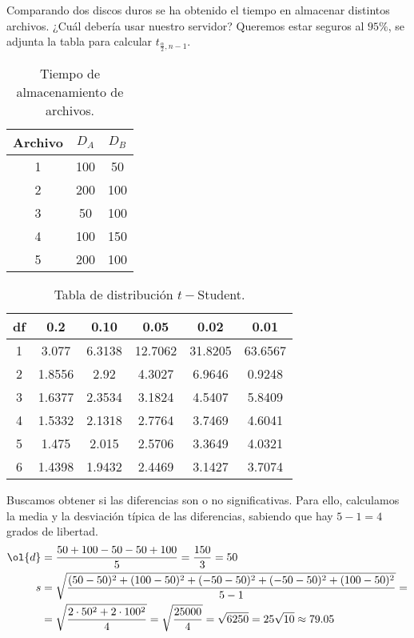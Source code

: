\documentclass[12pt]{article}
\begin{document}
    \begin{ejercicio}[3 puntos]
        Comparando dos discos duros se ha obtenido el tiempo en almacenar distintos archivos. ¿Cuál debería usar nuestro servidor? Queremos estar seguros al $95\%$, se adjunta la tabla para calcular $t_{\frac{\alpha}{2},n-1}$.
        \begin{table}[H]
        \centering
        \begin{tabular}{c|c|c}
            Archivo & $D_A$ & $D_B$ \\
            \hline
            1     & 100 & 50 \\
            2     & 200 & 100 \\
            3     & 50 & 100 \\
            4     & 100 & 150 \\
            5     & 200 & 100
        \end{tabular}
        \caption{Tiempo de almacenamiento de archivos.}
        \end{table}
        \begin{table}[H]
        \centering
        \begin{tabular}{c|c|c|c|c|c|}
            df & 0.2 & 0.10 & 0.05 & 0.02 & 0.01 \\
            \hline
            1 & 3.077 & 6.3138 & 12.7062 & 31.8205 & 63.6567 \\
            2 & 1.8556 & 2.92 & 4.3027 & 6.9646 & 0.9248 \\
            3 & 1.6377 & 2.3534 & 3.1824 & 4.5407 & 5.8409 \\
            4 & 1.5332 & 2.1318 & 2.7764 & 3.7469 & 4.6041 \\
            5 & 1.475 & 2.015 & 2.5706 & 3.3649 & 4.0321 \\
            6 & 1.4398 & 1.9432 & 2.4469 & 3.1427 & 3.7074
        \end{tabular}
        \caption{Tabla de distribución $t-$Student.}
        \end{table}

        Buscamos obtener si las diferencias son o no significativas. Para ello, calculamos la media y la desviación típica de las diferencias, sabiendo que hay $5-1=4$ grados de libertad.
        \begin{align*}
            \ol{d} &= \frac{50 + 100 - 50 - 50 + 100}{5} = \frac{150}{3} = 50\\
            s &= \sqrt{\frac{(50 - 50)^2 + (100 - 50)^2 + (-50 - 50)^2 + (-50 - 50)^2 + (100 - 50)^2}{5-1}}
            =\\&= \sqrt{\frac{2\cdot 50^2 + 2\cdot 100^2}{4}}
            = \sqrt{\frac{25000}{4}} = \sqrt{6250} = 25\sqrt{10} \approx 79.05
        \end{align*}


\end{ejercicio}
\end{document}

